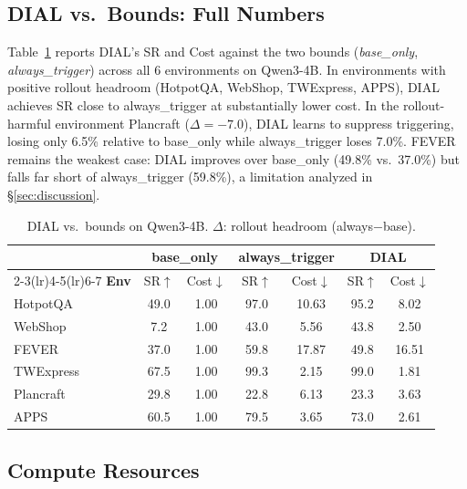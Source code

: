 

\subsection{DIAL vs.\ Bounds: Full Numbers}
\label{app:bounds-comparison}

Table~\ref{tab:bounds-comparison} reports DIAL's SR and Cost
against the two bounds (\emph{base\_only}, \emph{always\_trigger})
across all 6 environments on Qwen3-4B. In environments with
positive rollout headroom (HotpotQA, WebShop, TWExpress, APPS),
DIAL achieves SR close to always\_trigger at substantially lower
cost. In the rollout-harmful environment Plancraft
($\Delta{=}{-}7.0$), DIAL learns to suppress triggering, losing
only 6.5\% relative to base\_only while always\_trigger loses
7.0\%. FEVER remains the weakest case: DIAL improves over
base\_only (49.8\% vs.\ 37.0\%) but falls far short of
always\_trigger (59.8\%), a limitation analyzed in
\S\ref{sec:discussion}.

\begin{table}[h!]
\caption{DIAL vs.\ bounds on Qwen3-4B. $\Delta$: rollout headroom
(always$-$base).}
\label{tab:bounds-comparison}
\centering\small
\begin{tabular}{lcccccc}
\toprule
& \multicolumn{2}{c}{\textbf{base\_only}}
& \multicolumn{2}{c}{\textbf{always\_trigger}}
& \multicolumn{2}{c}{\textbf{DIAL}} \\
\cmidrule(lr){2-3}\cmidrule(lr){4-5}\cmidrule(lr){6-7}
\textbf{Env} & SR$\uparrow$ & Cost$\downarrow$ & SR$\uparrow$ & Cost$\downarrow$ & SR$\uparrow$ & Cost$\downarrow$ \\
\midrule
HotpotQA  & 49.0 & 1.00 & 97.0 & 10.63 & 95.2 & 8.02 \\
WebShop   &  7.2 & 1.00 & 43.0 &  5.56 & 43.8 & 2.50 \\
FEVER     & 37.0 & 1.00 & 59.8 &  17.87 & 49.8 & 16.51 \\
TWExpress & 67.5 & 1.00 & 99.3 &  2.15 & 99.0 & 1.81 \\
Plancraft & 29.8 & 1.00 & 22.8 &  6.13 & 23.3 & 3.63 \\
APPS      & 60.5 & 1.00 & 79.5 &  3.65 & 73.0 & 2.61 \\
\bottomrule
\end{tabular}
\end{table}


\subsection{Compute Resources}
\label{app:compute}

